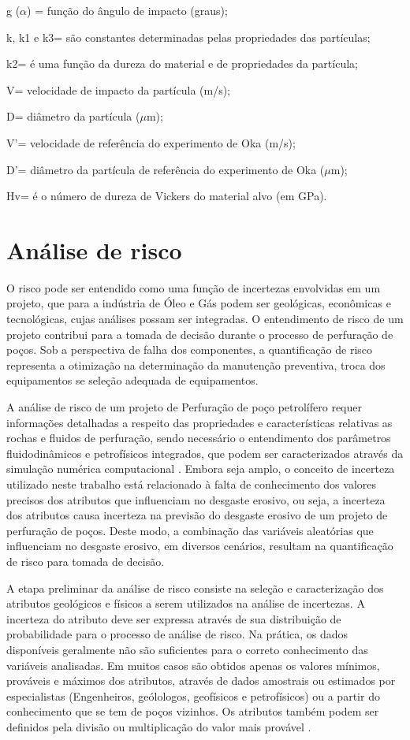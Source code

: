 g ($\alpha$) = função do ângulo de impacto (graus);

k, k1 e k3= são constantes determinadas pelas propriedades das partículas;

k2= é uma função da dureza do material e de propriedades da partícula;

V= velocidade de impacto da partícula (m/s);

D= diâmetro da partícula ($\mu$m);

V'= velocidade de referência do experimento de Oka (m/s);

D'= diâmetro da partícula de referência do experimento de Oka ($\mu$m);

Hv= é o número de dureza de Vickers do material alvo (em GPa).


\section{Análise de risco}

O risco pode ser entendido como uma função de incertezas envolvidas em um projeto, que para a indústria de Óleo e Gás podem ser geológicas, econômicas e tecnológicas, cujas análises possam ser integradas. O entendimento de risco de um projeto contribui para a tomada de decisão durante o processo de perfuração de poços. Sob a perspectiva de falha dos componentes, a quantificação de risco representa a otimização na determinação da manutenção preventiva, troca dos equipamentos se seleção adequada de equipamentos.

A análise de risco de um projeto de Perfuração de poço petrolífero requer informações detalhadas a respeito das propriedades e características relativas as rochas e fluidos de perfuração, sendo necessário o entendimento dos parâmetros fluidodinâmicos e petrofísicos integrados, que podem ser caracterizados através da simulação numérica computacional \cite{loschiavo}. Embora seja amplo, o conceito de incerteza utilizado neste trabalho está relacionado à falta de conhecimento dos valores precisos dos atributos que influenciam no desgaste erosivo, ou seja, a incerteza dos atributos causa incerteza na previsão do desgaste erosivo de um projeto de perfuração de poços. Deste modo, a combinação das variáveis aleatórias que influenciam no desgaste erosivo, em diversos cenários, resultam na quantificação de risco para tomada de decisão.

A etapa preliminar da análise de risco consiste na seleção e caracterização dos atributos geológicos e físicos a serem utilizados na análise de incertezas. A incerteza do atributo deve ser expressa através de sua distribuição de probabilidade para o processo de análise de risco. Na prática, os dados disponíveis geralmente não são suficientes para o correto conhecimento das variáveis analisadas. Em muitos casos são obtidos apenas os valores mínimos, prováveis e máximos dos atributos, através de dados amostrais ou estimados por especialistas (Engenheiros, geólologos, geofísicos e petrofísicos) ou a partir do conhecimento que se tem de poços vizinhos. Os atributos também podem ser definidos pela divisão ou multiplicação do valor mais provável \cite{steagall}.

